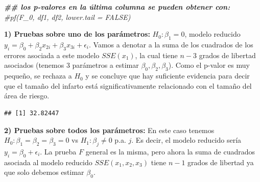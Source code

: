 \documentclass[
]{book}
\newenvironment{Shaded}{\begin{snugshade}}{\end{snugshade}}
\newcommand{\AttributeTok}[1]{\textcolor[rgb]{0.13,0.29,0.53}{#1}}
\newcommand{\CommentTok}[1]{\textcolor[rgb]{0.56,0.35,0.01}{\textit{#1}}}
\newcommand{\DecValTok}[1]{\textcolor[rgb]{0.00,0.00,0.81}{#1}}
\newcommand{\DocumentationTok}[1]{\textcolor[rgb]{0.56,0.35,0.01}{\textbf{\textit{#1}}}}
\newcommand{\FunctionTok}[1]{\textcolor[rgb]{0.13,0.29,0.53}{\textbf{#1}}}
\newcommand{\NormalTok}[1]{#1}
\newcommand{\OtherTok}[1]{\textcolor[rgb]{0.56,0.35,0.01}{#1}}
\newcommand{\SpecialCharTok}[1]{\textcolor[rgb]{0.81,0.36,0.00}{\textbf{#1}}}
\newcommand{\StringTok}[1]{\textcolor[rgb]{0.31,0.60,0.02}{#1}}
\begin{document}
\begin{Shaded}
\begin{Highlighting}[]
\DocumentationTok{\#\# los p{-}valores en la última columna se pueden obtener con: }
\CommentTok{\#pf(F\_0, df1, df2, lower.tail = FALSE)}
\end{Highlighting}
\end{Shaded}

\textbf{1) Pruebas sobre uno de los parámetros:} \(H_0:\beta_1=0\), modelo reducido \(y_i = \beta_0  +\beta_2x_{2i} + \beta_3x_{3i}+\epsilon_i\). Vamos a denotar a la suma de los cuadrados de los errores asociada a este modelo \(SSE(x_1)\), la cual tiene \(n-3\) grados de libertad asociados (tenemos 3 parámetros a estimar \(\beta_0,\beta_2,\beta_3\)). Como el p-valor es muy pequeño, se rechaza a \(H_0\) y se concluye que hay suficiente evidencia para decir que el tamaño del infarto está significativamente relacionado con el tamaño del área de riesgo.

\begin{Shaded}
\end{Shaded}

\begin{verbatim}
## [1] 32.82447
\end{verbatim}

\textbf{2) Pruebas sobre todos los parámetros:} En este caso tenemos \(H_0:\beta_1=\beta_2=\beta_3=0\) vs \(H_1: \beta_j\neq 0\) p.a. \(j\). Es decir, el modelo reducido sería \(y_i = \beta_0+\epsilon_i\). La prueba \(F\) general es la misma, pero ahora la suma de cuadrados asociada al modelo reducido \(SSE(x_1,x_2,x_3)\) tiene \(n-1\) grados de libertad ya que solo debemos estimar \(\beta_0\).
\end{document}
